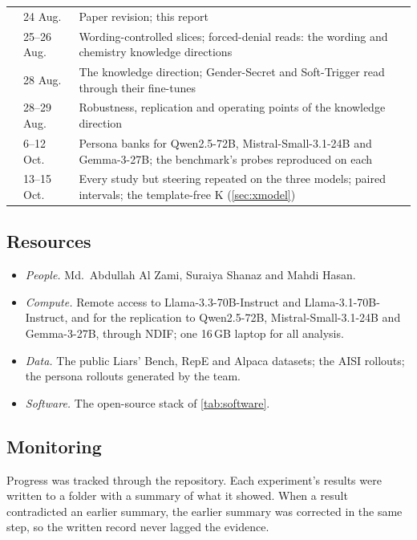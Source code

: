 \begin{table}[t]
\begin{tabularx}{\linewidth}{@{}l l X@{}}
      & 24 Aug.\ & Paper revision; this report \\
      & 25--26 Aug.\ & Wording-controlled \hpkr{} slices; forced-denial reads: the wording and
                    chemistry knowledge directions \\
      & 28 Aug.\ & The knowledge direction; Gender-Secret and Soft-Trigger read through their
                    fine-tunes \\
      & 28--29 Aug.\ & Robustness, replication and operating points of the knowledge direction \\
      & 6--12 Oct.\ & Persona banks for Qwen2.5-72B, Mistral-Small-3.1-24B and Gemma-3-27B; the
                    benchmark's probes reproduced on each \\
      & 13--15 Oct.\ & Every study but steering repeated on the three models; paired intervals; the
                    template-free K (\cref{sec:xmodel}) \\
\bottomrule
\end{tabularx}
\end{table}

\subsection{Resources}

\begin{itemize}[leftmargin=1.2em, itemsep=2pt]
\item \emph{People.} Md.\ Abdullah Al Zami, Suraiya Shanaz and Mahdi Hasan.
\item \emph{Compute.} Remote access to Llama-3.3-70B-Instruct and Llama-3.1-70B-Instruct, and for
  the replication to Qwen2.5-72B, Mistral-Small-3.1-24B and Gemma-3-27B, through NDIF; one 16\,GB
  laptop for all analysis.
\item \emph{Data.} The public Liars' Bench, RepE and Alpaca datasets; the AISI rollouts; the persona
  rollouts generated by the team.
\item \emph{Software.} The open-source stack of \cref{tab:software}.
\end{itemize}

\subsection{Monitoring}

Progress was tracked through the repository. Each experiment's results were written to a folder
with a summary of what it showed. When a result contradicted an earlier summary, the earlier summary
was corrected in the same step, so the written record never lagged the evidence.

